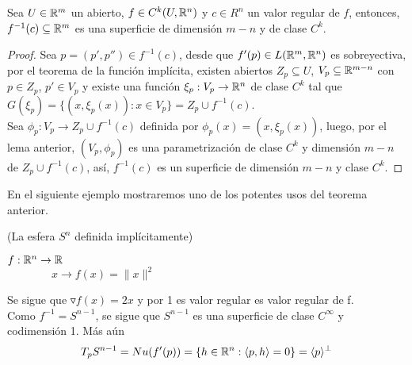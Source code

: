 \begin{Teo}
Sea $U\in{\mathbb{R}}^{m}$ un abierto, $f\in C^{k}(U,{\mathbb{R}}^{n})$ y $c\in R^{n}$ un valor regular de $f$, entonces, $f^{-1}(c)\subseteq{\mathbb{R}}^{m}$ es una superficie de dimensión $m-n$ y de clase $C^{k}$.
\end{Teo}

\begin{proof}
Sea $p=(p',p'')\in f^{-1}(c)$, desde que $f'(p)\in L({\mathbb{R}}^{m},{\mathbb{R}}^{n})$ es sobreyectiva, por el teorema de la función implícita, existen abiertos $Z_{p}\subseteq U$, $V_{p}\subseteq{\mathbb{R}}^{m-n}$ con $p\in Z_{p}$, $p'\in V_{p}$ y existe una función $\xi_{p}:V_{p}\rightarrow{\mathbb{R}}^{n}$ de clase $C^{k}$ tal que $G(\xi_{p})=\{(x,\xi_{p}(x)):x\in V_{p}\}=Z_{p}\cup f^{-1}(c)$.\\Sea $\phi_{p}:V_{p}\rightarrow Z_{p}\cup f^{-1}(c)$ definida por $\phi_{p}(x)=(x,\xi_{p}(x))$, luego, por el lema anterior, $(V_{p},\phi_{p})$ es una parametrización de clase $C^{k}$ y dimensión $m-n$ de $Z_{p}\cup f^{-1}(c)$, así, $f^{-1}(c)$ es un superficie de dimensión $m-n$ y clase $C^{k}$.
\end{proof}

\begin{Obs}
En el siguiente ejemplo mostraremos uno de los potentes usos del teorema anterior. 
\end{Obs}

\begin{Ejm}(La esfera $S^n$ definida implícitamente)
\begin{center}
    $f:{\mathbb{R}}^n \rightarrow {\mathbb{R}}$\\
    $\qquad \qquad  x\longrightarrow f(x)=\|x\|^2$
\end{center}
Se sigue que $\triangledown f(x)=2x$ y por 1 es valor regular es valor regular de f.\\ Como $f^{-1}=S^{n-1}$, se sigue que $S^{n-1}$ es una superficie de clase $C^\infty$ y codimensión 1. Más aún $$T_pS^{n-1}=Nu(f'(p))=\{h\in{\mathbb{R}}^n :\langle p,h \rangle=0\}=\langle p\rangle^\bot$$
\end{Ejm}